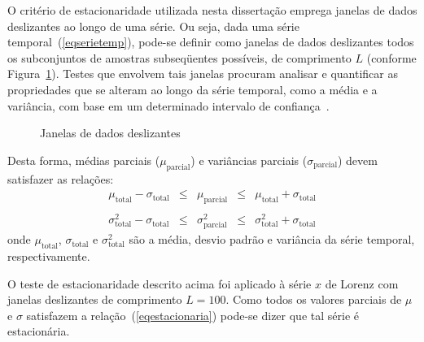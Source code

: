 O critério de estacionaridade utilizada nesta dissertação emprega janelas de dados deslizantes ao longo de uma série. Ou seja, dada uma série temporal~(\ref{eqserietemp}), pode-se definir como janelas de dados deslizantes todos os subconjuntos de amostras subseqüentes possíveis, de comprimento $L$ (conforme Figura~\ref{figestaciogeral}). Testes que envolvem tais janelas procuram analisar e quantificar as propriedades que se alteram ao longo da série temporal, como a média e a variância, com base em um determinado intervalo de confiança~\cite{alvaro/01}.


\begin{figure}[!ht]
\begin{center}
\resizebox{12cm}{!}{}
\caption{Janelas de dados deslizantes} 
\end{center}
\label{figestaciogeral}
\end{figure}
 
Desta forma, médias parciais ($\mu_{\textrm{parcial}}$) e variâncias parciais ($\sigma_{\textrm{parcial}}$) devem satisfazer as relações:
\begin{equation}
\begin{array}{rcccl}
\mu_{\textrm{total}}-\sigma_{\textrm{total}} & \leq  &  \mu_{\textrm{parcial}} & \leq  & \mu_{\textrm{total}}+\sigma_{\textrm{total}}\\
&   &   &   &\\
\sigma_{\textrm{total}}^2-\sigma_{\textrm{total}} & \leq  &  \sigma_{\textrm{parcial}}^2 & \leq  & \sigma_{\textrm{total}}^2+\sigma_{\textrm{total}}
\end{array}
\label{eqestacionaria}
\end{equation} 
onde $\mu_{\textrm{total}}$, $\sigma_{\textrm{total}}$ e $\sigma_{\textrm{total}}^2$ são a média, desvio padrão e variância da série temporal, respectivamente.

O teste de estacionaridade descrito acima foi aplicado à série $x$ de Lorenz com janelas deslizantes de comprimento $L=100$. Como todos os valores parciais de $\mu$ e $\sigma$ satisfazem a relação~(\ref{eqestacionaria}) pode-se dizer que tal série é estacionária.



